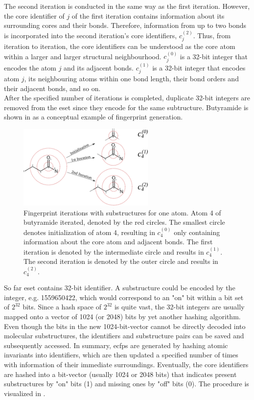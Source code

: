 The second iteration is conducted in the same way as the first iteration. However, the core identifier of $j$ of the first iteration contains information about its surrounding cores and their bonds. Therefore, information from up to two bonds is incorporated into the second iteration's core identifiers, $c^{(2)}_j$. Thus, from iteration to iteration, the core identifiers can be understood as the core atom within a larger and larger structural neighbourhood. $c^{(0)}_j$ is a 32-bit integer that encodes the atom $j$ and its adjacent bonds. $c^{(1)}_j$ is a 32-bit integer that encodes atom $j$, its neighbouring atoms within one bond length, their bond orders and their adjacent bonds, and so on.\cite{Rogers2010}\\
After the specified number of iterations is completed, duplicate 32-bit integers are removed from the \acl{eset} since they encode for the same subtructure. Butyramide is shown in  as a conceptual example of fingerprint generation.\cite{Rogers2010}
\begin{figure}[H]
	\centering
	\includegraphics[width=0.6\textwidth]{figures/butyramide_ecfp.pdf}
	\caption[Fingerprint Iterations with Substructures for One Atom]{Fingerprint iterations with substructures for one atom. Atom 4 of butyramide iterated, denoted by the red circles. The smallest circle denotes initialization of atom 4, resulting in $c^{(0)}_4$ only containing information about the core atom and adjacent bonds. The first iteration is denoted by the intermediate circle and results in $c^{(1)}_4$. The second iteration is denoted by the outer circle and results in $c^{(2)}_4$.}
	\label{fig:butyramideecfp}
\end{figure}
So far \acl{eset} contains 32-bit identifier. A substructure could be encoded by the integer, e.g. 1559650422, which would correspond to an "on" bit within a bit set of $2^{32}$ bits. Since a hash space of $2^{32}$ is quite vast, the 32-bit integers are usually mapped onto a vector of 1024 (or 2048) bits by yet another hashing algorithm. Even though the bits in the new 1024-bit-vector cannot be directly decoded into molecular substructures, the identifiers and substructure pairs can be saved and subsequently accessed. In summary, \acp{ecfp} are generated by hashing atomic invariants into identifiers, which are then updated a specified number of times with information of their immediate surroundings. Eventually, the core identifiers are hashed into a bit-vector (usually 1024 or 2048 bits) that indicates present substructures by "on" bits (1) and missing ones by "off" bits (0). The procedure is visualized in .
